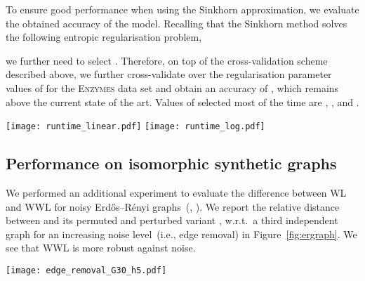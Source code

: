 \documentclass{article}
\begin{document}
To ensure good performance when using the Sinkhorn approximation, we evaluate the obtained accuracy of the model. 
Recalling that the Sinkhorn method solves the following entropic regularisation problem,

we further need to select . Therefore, on top of the cross-validation scheme described above, we further cross-validate over the regularisation parameter values of  for the \textsc{Enzymes} data set and obtain an accuracy of , which remains above the current state of the art. Values of  selected most of the time are , , and .

\begin{figure*}[t]
\vskip 0.2in
  \centering
  \texttt{[image: runtime\_linear.pdf]}
  \texttt{[image: runtime\_log.pdf]}
\caption{Runtime performance of the WWL Kernel computation step with a fixed number of graphs. We also report the time taken to compute the ground distance matrix as . Here,  is the sum of the time to compute the ground distance and the time taken to solve the optimal transport (ot) problem for the regular solver or the Sinkhorn-regularised one.
The logarithmic scale on the right-side figure shows how, for a small average number of nodes, the overhead to run Sinkhorn is higher than the benefits.}
\label{fig:runtime}
\vskip -0.2in
\end{figure*}


\subsection{Performance on isomorphic synthetic graphs}
\label{app:isomorphic}
We performed an additional experiment to evaluate the difference between WL and WWL for noisy  Erd\H{o}s--R\'enyi graphs~(, ). We report the relative distance between  and its permuted and perturbed variant , w.r.t.\ a third independent graph  for an increasing noise level~(i.e., edge removal) in Figure~\ref{fig:ergraph}. We see that WWL is more robust against noise. 

\begin{figure*}[t]
\vskip 0.2in
  \centering
  \texttt{[image: edge\_removal\_G30\_h5.pdf]}
\caption{Relative distance between (Erd\H{o}s--R\'enyi) graph  and its permuted and perturbed variant  w.r.t.\ a third independent graph  for an increasing noise level.}
\label{fig:ergraph}
\vskip -0.2in
\end{figure*}
\end{document}
